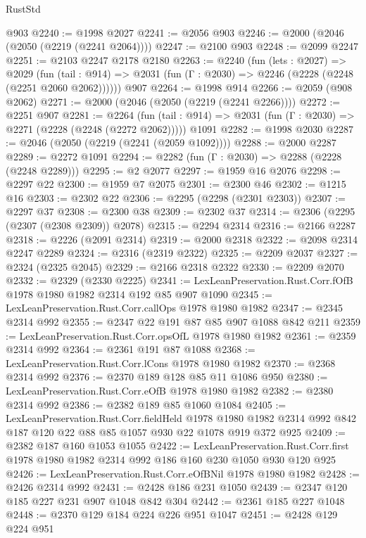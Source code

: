 \begin{lexlean}{RustStd}
\begin{coremodule}
    @903
@2240 := @1998 @2027
@2241 := @2056 @903
@2246 := @2000 (@2046 (@2050 (@2219 (@2241 @2064))))
@2247 := @2100 @903
@2248 := @2099 @2247
@2251 := @2103 @2247 @2178 @2180
@2263 := @2240
    (fun (lets : @2027) =>
    @2029
      (fun (tail : @914) => @2031 (fun (Γ : @2030) => @2246 (@2228 (@2248 (@2251 @2060 @2062))))))
    @907
@2264 := @1998 @914
@2266 := @2059 (@908 @2062)
@2271 := @2000 (@2046 (@2050 (@2219 (@2241 @2266))))
@2272 := @2251 @907
@2281 := @2264
    (fun (tail : @914) => @2031 (fun (Γ : @2030) => @2271 (@2228 (@2248 (@2272 @2062)))))
    @1091
@2282 := @1998 @2030
@2287 := @2046 (@2050 (@2219 (@2241 (@2059 @1092))))
@2288 := @2000 @2287
@2289 := @2272 @1091
@2294 := @2282 (fun (Γ : @2030) => @2288 (@2228 (@2248 @2289)))
@2295 := @2 @2077
@2297 := @1959 @16 @2076
@2298 := @2297 @22
@2300 := @1959 @7 @2075
@2301 := @2300 @46
@2302 := @1215 @16
@2303 := @2302 @22
@2306 := @2295 (@2298 (@2301 @2303))
@2307 := @2297 @37
@2308 := @2300 @38
@2309 := @2302 @37
@2314 := @2306 (@2295 (@2307 (@2308 @2309)) @2078)
@2315 := @2294 @2314
@2316 := @2166 @2287
@2318 := @2226 (@2091 @2314)
@2319 := @2000 @2318
@2322 := @2098 @2314 @2247 @2289
@2324 := @2316 (@2319 @2322)
@2325 := @2209 @2037
@2327 := @2324 (@2325 @2045)
@2329 := @2166 @2318 @2322
@2330 := @2209 @2070
@2332 := @2329 (@2330 @2225)
@2341 := LexLeanPreservation.Rust.Corr.fOfB @1978 @1980 @1982 @2314 @192 @85 @907 @1090
@2345 := LexLeanPreservation.Rust.Corr.callOps @1978 @1980 @1982
@2347 := @2345 @2314 @992
@2355 := @2347 @22 @191 @87 @85 @907 @1088 @842 @211
@2359 := LexLeanPreservation.Rust.Corr.opsOfL @1978 @1980 @1982
@2361 := @2359 @2314 @992
@2364 := @2361 @191 @87 @1088
@2368 := LexLeanPreservation.Rust.Corr.lCons @1978 @1980 @1982
@2370 := @2368 @2314 @992
@2376 := @2370 @189 @128 @85 @11 @1086 @950
@2380 := LexLeanPreservation.Rust.Corr.eOfB @1978 @1980 @1982
@2382 := @2380 @2314 @992
@2386 := @2382 @189 @85 @1060 @1084
@2405 := LexLeanPreservation.Rust.Corr.fieldHeld
    @1978
    @1980
    @1982
    @2314
    @992
    @842
    @187
    @120
    @22
    @88
    @85
    @1057
    @930
    @22
    @1078
    @919
    @372
    @925
@2409 := @2382 @187 @160 @1053 @1055
@2422 := LexLeanPreservation.Rust.Corr.first
    @1978
    @1980
    @1982
    @2314
    @992
    @186
    @160
    @230
    @1050
    @930
    @120
    @925
@2426 := LexLeanPreservation.Rust.Corr.eOfBNil @1978 @1980 @1982
@2428 := @2426 @2314 @992
@2431 := @2428 @186 @231 @1050
@2439 := @2347 @120 @185 @227 @231 @907 @1048 @842 @304
@2442 := @2361 @185 @227 @1048
@2448 := @2370 @129 @184 @224 @226 @951 @1047
@2451 := @2428 @129 @224 @951

\end{coremodule}
\end{lexlean}
